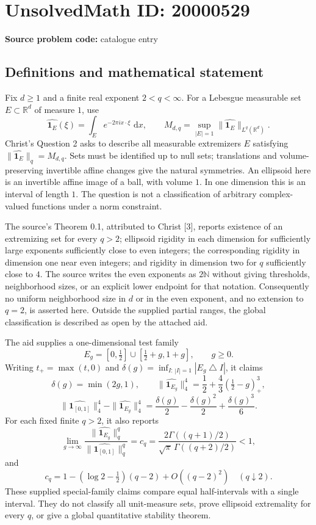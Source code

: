 \documentclass[11pt]{article}
\newcommand{\N}{\mathbb{N}}
\newcommand{\R}{\mathbb{R}}
\newcommand{\dd}{\,\mathrm{d}}
\begin{document}
\section*{UnsolvedMath ID: 20000529}
\textbf{Source problem code:} catalogue entry
\subsection{Definitions and mathematical statement}
Fix \(d\geq1\) and a finite real exponent \(2<q<\infty\). For a Lebesgue measurable set \(E\subset\R^d\) of measure \(1\), use
\[
\widehat{\mathbf1_E}(\xi)=\int_E e^{-2\pi i x\cdot\xi}\,\dd x,
\qquad M_{d,q}=\sup_{|E|=1}\|\widehat{\mathbf1_E}\|_{L^q(\R^d)}.
\]
Christ's Question 2 asks to describe all measurable extremizers \(E\) satisfying \(\|\widehat{\mathbf1_E}\|_q=M_{d,q}\). Sets must be identified up to null sets; translations and volume-preserving invertible affine changes give the natural symmetries. An ellipsoid here is an invertible affine image of a ball, with volume \(1\). In one dimension this is an interval of length \(1\). The question is not a classification of arbitrary complex-valued functions under a norm constraint.

The source's Theorem 0.1, attributed to Christ [3], reports existence of an extremizing set for every \(q>2\); ellipsoid rigidity in each dimension for sufficiently large exponents sufficiently close to even integers; the corresponding rigidity in dimension one near even integers; and rigidity in dimension two for \(q\) sufficiently close to \(4\). The source writes the even exponents as \(2\N\) without giving thresholds, neighborhood sizes, or an explicit lower endpoint for that notation. Consequently no uniform neighborhood size in \(d\) or in the even exponent, and no extension to \(q=2\), is asserted here. Outside the supplied partial ranges, the global classification is described as open by the attached aid.

The aid supplies a one-dimensional test family
\[
E_g=[0,\tfrac12]\cup[\tfrac12+g,1+g],\qquad g\geq0.
\]
Writing \(t_+=\max(t,0)\) and
\(\delta(g)=\inf_{I:\,|I|=1}|E_g\mathbin{\triangle}I|\), it claims
\[
\delta(g)=\min(2g,1),\qquad
\|\widehat{\mathbf1_{E_g}}\|_4^4
=\frac12+\frac43(\tfrac12-g)_+^3,
\]
\[
\|\widehat{\mathbf1_{[0,1]}}\|_4^4-
\|\widehat{\mathbf1_{E_g}}\|_4^4
=\frac{\delta(g)}2-\frac{\delta(g)^2}2+\frac{\delta(g)^3}6.
\]
For each fixed finite \(q>2\), it also reports
\[
\lim_{g\to\infty}
\frac{\|\widehat{\mathbf1_{E_g}}\|_q^q}{\|\widehat{\mathbf1_{[0,1]}}\|_q^q}
=c_q=\frac{2\Gamma((q+1)/2)}{\sqrt\pi\,\Gamma((q+2)/2)}<1,
\]
and
\[
c_q=1-(\log2-\tfrac12)(q-2)+O((q-2)^2)
\quad(q\downarrow2).
\]
These supplied special-family claims compare equal half-intervals with a single interval. They do not classify all unit-measure sets, prove ellipsoid extremality for every \(q\), or give a global quantitative stability theorem.
\end{document}
